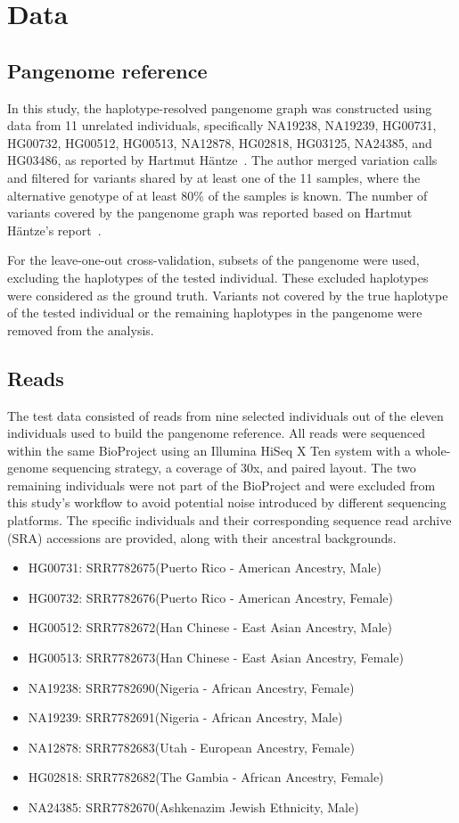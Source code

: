 \documentclass{PHlab-thesis}
\begin{document}
\chapter{Data}
\section{Pangenome reference}
In this study, the haplotype-resolved pangenome graph was constructed using data from 11 unrelated individuals, specifically NA19238, NA19239, HG00731, HG00732, HG00512, HG00513, NA12878, HG02818, HG03125, NA24385, and HG03486, as reported by Hartmut Häntze~\cite{haimo2023MaskedPanGenie}. The author merged variation calls and filtered for variants shared by at least one of the 11 samples, where the alternative genotype of at least 80\% of the samples is known. The number of variants covered by the pangenome graph was reported based on Hartmut Häntze's report~\cite{haimo2023MaskedPanGenie}.

For the leave-one-out cross-validation, subsets of the pangenome were used, excluding the haplotypes of the tested individual. These excluded haplotypes were considered as the ground truth. Variants not covered by the true haplotype of the tested individual or the remaining haplotypes in the pangenome were removed from the analysis.
\section{Reads}
The test data consisted of reads from nine selected individuals out of the eleven individuals used to build the pangenome reference. All reads were sequenced within the same BioProject using an Illumina HiSeq X Ten system with a whole-genome sequencing strategy, a coverage of 30x, and paired layout. The two remaining individuals were not part of the BioProject and were excluded from this study's workflow to avoid potential noise introduced by different sequencing platforms. The specific individuals and their corresponding sequence read archive (SRA) accessions are provided, along with their ancestral backgrounds.
\begin{itemize}
    \item HG00731: SRR7782675(Puerto Rico - American Ancestry, Male)
    \item HG00732: SRR7782676(Puerto Rico - American Ancestry, Female)
    \item HG00512: SRR7782672(Han Chinese - East Asian Ancestry, Male)
    \item HG00513: SRR7782673(Han Chinese - East Asian Ancestry, Female)
    \item NA19238: SRR7782690(Nigeria - African Ancestry, Female)
    \item NA19239: SRR7782691(Nigeria - African Ancestry, Male)
    \item NA12878: SRR7782683(Utah - European Ancestry, Female)
    \item HG02818: SRR7782682(The Gambia - African Ancestry, Female)
    \item NA24385: SRR7782670(Ashkenazim Jewish Ethnicity, Male)
\end{itemize}
\end{document}
